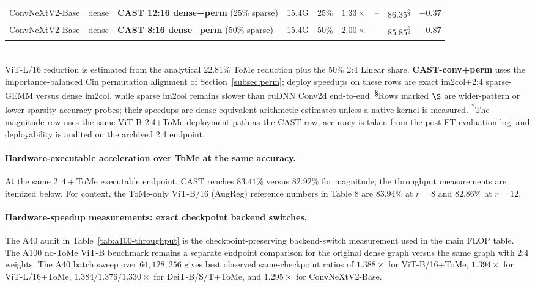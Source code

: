\documentclass[11pt]{article}
\theoremstyle{plain}
\theoremstyle{definition}
\theoremstyle{remark}
\newcommand{\1}{\mathbf{1}}
\begin{document}
\begin{table}[ht]
\begin{tabularx}{\textwidth}{l c X c c c c c c}
ConvNeXtV2-Base & dense & \textbf{CAST 12:16 dense+perm} (25\% sparse) & 15.4G & 25\% & \(1.33\times\) & -- & \(\mathbf{86.35}\)\textsuperscript{\S} & \(-0.37\) \\
ConvNeXtV2-Base & dense & \textbf{CAST 8:16 dense+perm} (50\% sparse) & 15.4G & 50\% & \(2.00\times\) & -- & \(\mathbf{85.85}\)\textsuperscript{\S} & \(-0.87\) \\
\bottomrule
\end{tabularx}\\[2pt]
{\footnotesize \textsuperscript{\dag}ViT-L/16 reduction is estimated from the analytical 22.81\% ToMe reduction plus the 50\% 2:4 Linear share. \textsuperscript{\ddag}\textbf{CAST-conv+perm} uses the importance-balanced Cin permutation alignment of Section~\ref{subsec:perm}; deploy speedups on these rows are exact im2col+2:4 sparse-GEMM versus dense im2col, while sparse im2col remains slower than cuDNN Conv2d end-to-end. \textsuperscript{\S}Rows marked \(\S\) are wider-pattern or lower-sparsity accuracy probes; their speedups are dense-equivalent arithmetic estimates unless a native kernel is measured. \textsuperscript{*}The magnitude row uses the same ViT-B 2:4+ToMe deployment path as the CAST row; accuracy is taken from the post-FT evaluation log, and deployability is audited on the archived 2:4 endpoint.}
\end{table}

\paragraph{Hardware-executable acceleration over ToMe at the same accuracy.}
At the same \(2{:}4{+}\)ToMe executable endpoint, CAST reaches \(83.41\%\) versus \(82.92\%\) for magnitude; the throughput measurements are itemized below. For context, the ToMe-only ViT-B/16 (AugReg) reference numbers in \cite{bolya2023tome} Table 8 are \(83.94\%\) at \(r=8\) and \(82.86\%\) at \(r=12\).

\paragraph{Hardware-speedup measurements: exact checkpoint backend switches.}
The A40 audit in Table~\ref{tab:a100-throughput} is the checkpoint-preserving backend-switch measurement used in the main FLOP table. The A100 no-ToMe ViT-B benchmark remains a separate endpoint comparison for the original dense graph versus the same graph with 2:4 weights.
The A40 batch sweep over \(64,128,256\) gives best observed same-checkpoint ratios of \(1.388\times\) for ViT-B/16+ToMe, \(1.394\times\) for ViT-L/16+ToMe, \(1.384/1.376/1.330\times\) for DeiT-B/S/T+ToMe, and \(1.295\times\) for ConvNeXtV2-Base.
\end{document}
